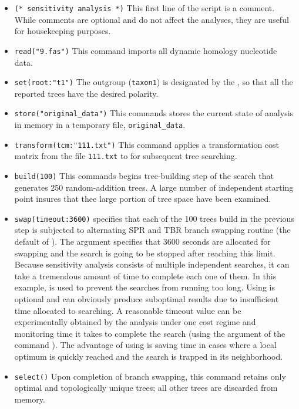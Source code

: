 \begin{itemize}
\item \texttt{(* sensitivity analysis *)} This first line of the script is a comment. While comments are optional and do not affect the analyses, they are useful for housekeeping purposes.
\item \texttt{read("9.fas")} This command imports all dynamic homology nucleotide data.
\item \texttt{set(root:"t1")} The outgroup (\texttt{taxon1}) is designated by the , so that all the reported trees have the desired polarity.
\item \texttt{store("original\_data")} This commands stores the current state of analysis in memory in a temporary file, \texttt{original\_data}.
\item \texttt{transform(tcm:"111.txt")} This command applies a transformation cost matrix from the file \texttt{111.txt} to for subsequent tree searching.
\item \texttt{build(100)} This commands begins tree-building step of the search that generates 250 random-addition trees. A large number of independent starting point insures that thee large portion of tree space have been examined.
\item \texttt{swap(timeout:3600)}  specifies that each of the 100 trees build in the previous step is subjected to alternating SPR and TBR branch swapping routine (the default of \poy). The argument  specifies that 3600 seconds are allocated for swapping and the search is going to be stopped after reaching this limit. Because sensitivity analysis consists of multiple independent searches, it can take a tremendous amount of time to complete each one of them. In this example,  is used to prevent the searches from running too long. Using  is optional and can obviously produce suboptimal results due to insufficient time allocated to searching. A reasonable timeout value can be experimentally obtained by the analysis under one cost regime and monitoring time it takes to complete the search (using the argument  of the command ). The advantage of using  is saving time in cases where a local optimum is quickly reached and the search is trapped in its neighborhood.
\item \texttt{select()} Upon completion of branch swapping, this command retains only optimal and topologically unique trees; all other trees are discarded from memory.

\end{itemize}
